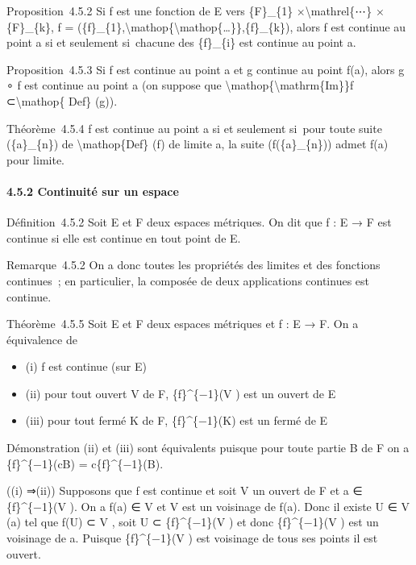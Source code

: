 \documentclass[]{article}
\begin{document}
Proposition~4.5.2 Si f est une fonction de E vers \{F\}\_\{1\}
×\textbackslash{}mathrel\{⋯\} × \{F\}\_\{k\}, f =
(\{f\}\_\{1\},\textbackslash{}mathop\{\textbackslash{}mathop\{\ldots{}\}\},\{f\}\_\{k\}),
alors f est continue au point a si et seulement si~chacune des
\{f\}\_\{i\} est continue au point a.

Proposition~4.5.3 Si f est continue au point a et g continue au point
f(a), alors g ∘ f est continue au point a (on suppose que
\textbackslash{}mathop\{\textbackslash{}mathrm\{Im\}\}f
⊂\textbackslash{}mathop\{ Def\} (g)).

Théorème~4.5.4 f est continue au point a si et seulement si~pour toute
suite (\{a\}\_\{n\}) de \textbackslash{}mathop\{Def\} (f) de limite a,
la suite (f(\{a\}\_\{n\})) admet f(a) pour limite.

\paragraph{4.5.2 Continuité sur un espace}

Définition~4.5.2 Soit E et F deux espaces métriques. On dit que f : E →
F est continue si elle est continue en tout point de E.

Remarque~4.5.2 On a donc toutes les propriétés des limites et des
fonctions continues~; en particulier, la composée de deux applications
continues est continue.

Théorème~4.5.5 Soit E et F deux espaces métriques et f : E → F. On a
équivalence de

\begin{itemize}
\itemsep1pt\parskip0pt
\item
  (i) f est continue (sur E)
\item
  (ii) pour tout ouvert V de F, \{f\}\^{}\{−1\}(V ) est un ouvert de E
\item
  (iii) pour tout fermé K de F, \{f\}\^{}\{−1\}(K) est un fermé de E
\end{itemize}

Démonstration (ii) et (iii) sont équivalents puisque pour toute partie B
de F on a \{f\}\^{}\{−1\}(cB) = c\{f\}\^{}\{−1\}(B).

((i) ⇒(ii)) Supposons que f est continue et soit V un ouvert de F et a ∈
\{f\}\^{}\{−1\}(V ). On a f(a) ∈ V et V est un voisinage de f(a). Donc
il existe U ∈ V (a) tel que f(U) ⊂ V , soit U ⊂ \{f\}\^{}\{−1\}(V ) et
donc \{f\}\^{}\{−1\}(V ) est un voisinage de a. Puisque
\{f\}\^{}\{−1\}(V ) est voisinage de tous ses points il est ouvert.
\end{document}
